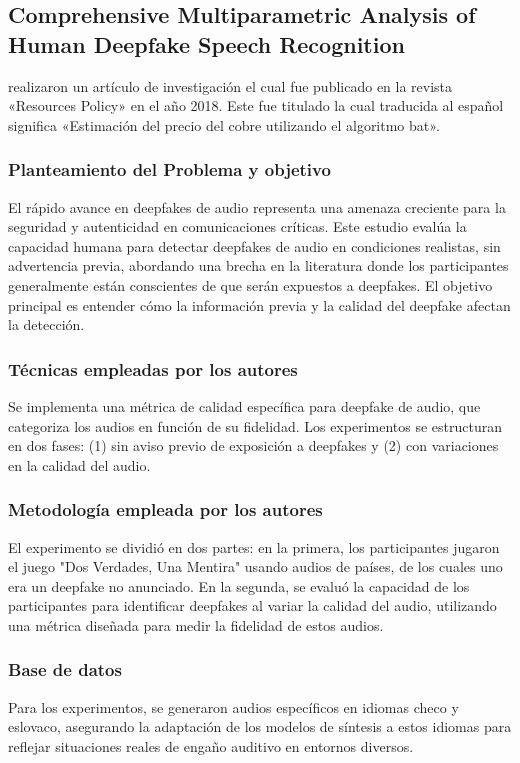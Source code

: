\subsection{Comprehensive Multiparametric Analysis of Human Deepfake Speech Recognition \citep*{pr_dehghani2018copper}}
\citeauthor{pr_dehghani2018copper} realizaron un artículo de investigación el cual fue publicado en la revista «Resources Policy» en el año 2018. Este fue titulado  la cual traducida al español significa «Estimación del precio del cobre utilizando el algoritmo bat».

\subsubsection{Planteamiento del Problema y objetivo }
El rápido avance en deepfakes de audio representa una amenaza creciente para la seguridad y autenticidad en comunicaciones críticas. Este estudio evalúa la capacidad humana para detectar deepfakes de audio en condiciones realistas, sin advertencia previa, abordando una brecha en la literatura donde los participantes generalmente están conscientes de que serán expuestos a deepfakes. El objetivo principal es entender cómo la información previa y la calidad del deepfake afectan la detección.

\subsubsection{Técnicas empleadas por los autores}
Se implementa una métrica de calidad específica para deepfake de audio, que categoriza los audios en función de su fidelidad. Los experimentos se estructuran en dos fases: (1) sin aviso previo de exposición a deepfakes y (2) con variaciones en la calidad del audio.

\subsubsection{Metodología empleada por los autores}
El experimento se dividió en dos partes: en la primera, los participantes jugaron el juego "Dos Verdades, Una Mentira" usando audios de países, de los cuales uno era un deepfake no anunciado. En la segunda, se evaluó la capacidad de los participantes para identificar deepfakes al variar la calidad del audio, utilizando una métrica diseñada para medir la fidelidad de estos audios.

\subsubsection{Base de datos}
Para los experimentos, se generaron audios específicos en idiomas checo y eslovaco, asegurando la adaptación de los modelos de síntesis a estos idiomas para reflejar situaciones reales de engaño auditivo en entornos diversos.


